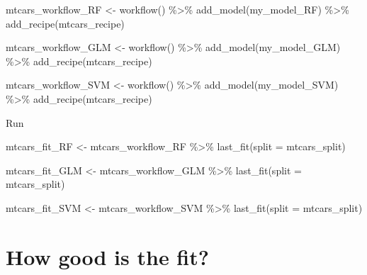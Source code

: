 \documentclass[
]{book}
\newenvironment{Shaded}{\begin{snugshade}}{\end{snugshade}}
\newcommand{\AttributeTok}[1]{\textcolor[rgb]{0.77,0.63,0.00}{#1}}
\newcommand{\FunctionTok}[1]{\textcolor[rgb]{0.00,0.00,0.00}{#1}}
\newcommand{\NormalTok}[1]{#1}
\newcommand{\OtherTok}[1]{\textcolor[rgb]{0.56,0.35,0.01}{#1}}
\newcommand{\SpecialCharTok}[1]{\textcolor[rgb]{0.00,0.00,0.00}{#1}}
\begin{document}
\begin{Shaded}
\begin{Highlighting}[]
\NormalTok{mtcars\_workflow\_RF }\OtherTok{\textless{}{-}} \FunctionTok{workflow}\NormalTok{() }\SpecialCharTok{\%\textgreater{}\%} 
                  \FunctionTok{add\_model}\NormalTok{(my\_model\_RF) }\SpecialCharTok{\%\textgreater{}\%} 
                  \FunctionTok{add\_recipe}\NormalTok{(mtcars\_recipe)}

\NormalTok{mtcars\_workflow\_GLM }\OtherTok{\textless{}{-}} \FunctionTok{workflow}\NormalTok{() }\SpecialCharTok{\%\textgreater{}\%} 
                  \FunctionTok{add\_model}\NormalTok{(my\_model\_GLM) }\SpecialCharTok{\%\textgreater{}\%} 
                  \FunctionTok{add\_recipe}\NormalTok{(mtcars\_recipe)}

\NormalTok{mtcars\_workflow\_SVM }\OtherTok{\textless{}{-}} \FunctionTok{workflow}\NormalTok{() }\SpecialCharTok{\%\textgreater{}\%} 
                  \FunctionTok{add\_model}\NormalTok{(my\_model\_SVM) }\SpecialCharTok{\%\textgreater{}\%} 
                  \FunctionTok{add\_recipe}\NormalTok{(mtcars\_recipe)}
\end{Highlighting}
\end{Shaded}

Run

\begin{Shaded}
\begin{Highlighting}[]
\NormalTok{mtcars\_fit\_RF }\OtherTok{\textless{}{-}}\NormalTok{ mtcars\_workflow\_RF }\SpecialCharTok{\%\textgreater{}\%} 
             \FunctionTok{last\_fit}\NormalTok{(}\AttributeTok{split =}\NormalTok{ mtcars\_split)}

\NormalTok{mtcars\_fit\_GLM }\OtherTok{\textless{}{-}}\NormalTok{ mtcars\_workflow\_GLM }\SpecialCharTok{\%\textgreater{}\%} 
             \FunctionTok{last\_fit}\NormalTok{(}\AttributeTok{split =}\NormalTok{ mtcars\_split)}

\NormalTok{mtcars\_fit\_SVM }\OtherTok{\textless{}{-}}\NormalTok{ mtcars\_workflow\_SVM }\SpecialCharTok{\%\textgreater{}\%} 
             \FunctionTok{last\_fit}\NormalTok{(}\AttributeTok{split =}\NormalTok{ mtcars\_split)}
\end{Highlighting}
\end{Shaded}

\hypertarget{how-good-is-the-fit}{%
\section{How good is the fit?}\label{how-good-is-the-fit}}
\end{document}

